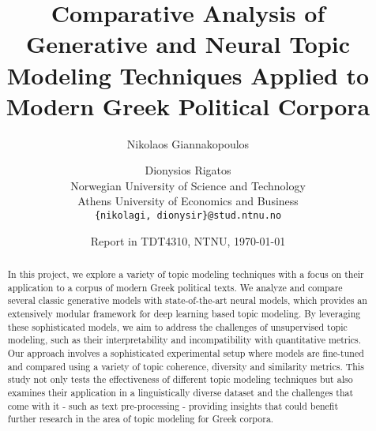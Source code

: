 \documentclass[11pt]{article}
\title{Comparative Analysis of Generative and Neural Topic Modeling Techniques Applied to Modern Greek Political Corpora}
\author{
  Nikolaos Giannakopoulos \and Dionysios Rigatos\\
  Norwegian University of Science and Technology \\
  Athens University of Economics and Business \\
  {\tt \{nikolagi, dionysir\}@stud.ntnu.no}}
\date{Report in TDT4310, NTNU, \today}
\begin{document}
\maketitle
\begin{abstract}
In this project, we explore a variety of topic modeling techniques with a focus on their application to a corpus of modern Greek political texts. We analyze and compare several classic generative models with state-of-the-art neural models, which provides an extensively modular framework for deep learning based topic modeling. By leveraging these sophisticated models, we aim to address the challenges of unsupervised topic modeling, such as their interpretability and incompatibility with quantitative metrics. Our approach involves a sophisticated experimental setup where models are fine-tuned and compared using a variety of topic coherence, diversity and similarity metrics. This study not only tests the effectiveness of different topic modeling techniques but also examines their application in a linguistically diverse dataset and the challenges that come with it - such as text pre-processing - providing insights that could benefit further research in the area of topic modeling for Greek corpora.
\end{abstract}













\appendix


%
\end{document}
